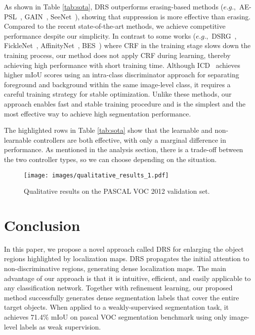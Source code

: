 \documentclass[letterpaper]{article} \usepackage{aaai21}  \usepackage{times}  \usepackage{helvet} \usepackage{courier}  \usepackage[hyphens]{url}  \usepackage{graphicx} \urlstyle{rm} \def\UrlFont{\rm}  \usepackage{natbib}  \usepackage{caption} \frenchspacing  \setlength{\pdfpagewidth}{8.5in}  \setlength{\pdfpageheight}{11in}
\begin{document}
As shown in Table \ref{tab:sota}, DRS outperforms erasing-based methods ($e.g.,$ AE-PSL~\cite{wei2017object}, GAIN~\cite{li2018tell}, SeeNet~\cite{hou2018self}), showing that suppression is more effective than erasing.
Compared to the recent state-of-the-art methods, we achieve competitive performance despite our simplicity.
In contrast to some works ($e.g.,$ DSRG~\cite{huang2018weakly}, FickleNet~\cite{lee2019ficklenet}, AffinityNet~\cite{ahn2018learning}, BES~\cite{chen2020weakly}) where CRF in the training stage slows down the training process, our method does not apply CRF during learning, thereby achieving high performance with short training time. 
Although ICD~\cite{fan2020learning} achieves higher mIoU scores using an intra-class discriminator approach for separating foreground and background within the same image-level class, it requires a careful training strategy for stable optimization.
Unlike these methods, our approach enables fast and stable training procedure and is the simplest and the most effective way to achieve high segmentation performance.

The highlighted rows in Table \ref{tab:sota} show that the learnable and non-learnable controllers are both effective, with only a marginal difference in performance.
As mentioned in the analysis section, there is a trade-off between the two controller types, so we can choose depending on the situation. 




\begin{figure}[t]
    \centering
    \texttt{[image: images/qualitative\_results\_1.pdf]}
    \caption{
        Qualitative results on the PASCAL VOC 2012 validation set.
    }
    \label{figure:result}
    \vspace{-1mm}
\end{figure}


\section{Conclusion}
In this paper, we propose a novel approach called DRS for enlarging the object regions highlighted by localization maps.
DRS propagates the initial attention to non-discriminative regions, generating dense localization maps.
The main advantage of our approach is that it is intuitive, efficient, and easily applicable to any classification network.
Together with refinement learning, our proposed method successfully generates dense segmentation labels that cover the entire target objects.
When applied to a weakly-supervised segmentation task, it achieves 71.4\% mIoU on pascal VOC segmentation benchmark using only image-level labels as weak supervision.

   


\end{document}
